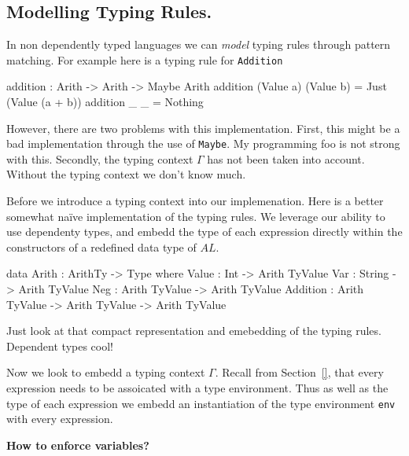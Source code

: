 \subsection{Modelling Typing Rules.}
\label{sec:rules:modelling}

In non dependently typed languages we can \emph{model} typing rules through pattern matching.
For example here is a typing rule for \texttt{Addition}
\begin{code}
addition : Arith -> Arith -> Maybe Arith
addition (Value a) (Value b) = Just (Value (a + b))
addition _ _ = Nothing
\end{code}

\noindent
However, there are two problems with this implementation.
First, this might be a bad implementation through the use of \texttt{Maybe}.
My programming foo is not strong with this.
Secondly, the typing context $\Gamma$ has not been taken into account.
Without the typing context we don't know much.

Before we introduce a typing context into our implemenation.
Here is a better somewhat na\"{i}ve implementation of the typing rules.
We leverage our ability to use dependenty types, and embedd the type of each expression directly within the constructors of a redefined data type of $AL$.

\begin{code}
data Arith : ArithTy -> Type where
  Value    : Int -> Arith TyValue
  Var      : String -> Arith TyValue
  Neg      : Arith TyValue -> Arith TyValue
  Addition : Arith TyValue -> Arith TyValue -> Arith TyValue
\end{code}

\noindent
Just look at that compact representation and emebedding of the typing rules.
Dependent types cool!

Now we look to embedd a typing context $\Gamma$.
Recall from Section~\ref{}, that every expression needs to be assoicated with a type environment.
Thus as well as the type of each expression we embedd an instantiation of the type environment \texttt{env} with every expression.

\begin{center}
  \bfseries How to enforce variables?
\end{center}

